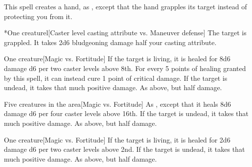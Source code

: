 \spellrng{\rngmed}
\spelldur{\durshort \dismissable}
\spellline
\spelleffect This spell creates a hand, as , except that the hand grapples its target instead of protecting you from it.
\begin{spelltarget}*{One creature}l[Caster level \add casting attribute vs. Maneuver defense]
    \spellsuccess The target is grappled. It takes 2d6 bludgeoning damage \add half your casting attribute.
\end{spelltarget}

\spellrng{\rngclose}
\begin{spelltarget}{One creature}[Magic vs. Fortitude]
    \spelleffect If the target is living, it is healed for 8d6 damage \add d6 per two caster levels above 8th. For every 5 points of healing granted by this spell, it can instead cure 1 point of critical damage.
    \spellsuccess If the target is undead, it takes that much positive damage.
    \spellfailure As above, but half damage.
\end{spelltarget}

\spellrng{\rngclose}
\begin{spelltargets}{Five creatures in the area}[Magic vs. Fortitude]
    \spelleffect As , except that it heals 8d6 damage \add d6 per four caster levels above 16th.
    \spellsuccess If the target is undead, it takes that much positive damage.
    \spellfailure As above, but half damage.
\end{spelltargets}

\spellrng{\rngclose}
\begin{spelltarget}{One creature}[Magic vs. Fortitude]
    \spelleffect If the target is living, it is healed for 2d6 damage \add d6 per two caster levels above 2nd.
    \spellsuccess If the target is undead, it takes that much positive damage.
    \spellfailure As above, but half damage.
\end{spelltarget}

